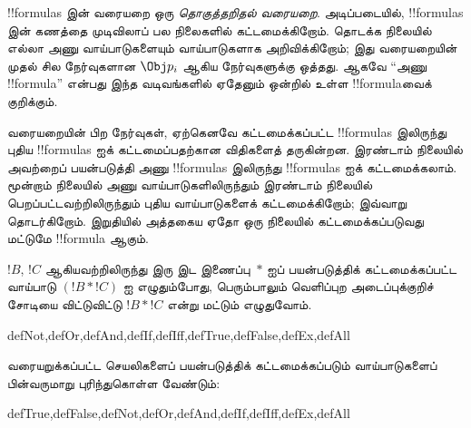 \documentclass[../../../include/open-logic-section]{subfiles}
\begin{document}
\begin{explain}
!!{formula}s இன் வரையறை ஒரு \emph{தொகுத்தறிதல் வரையறை}. அடிப்படையில்,
!!{formula}s இன் கணத்தை முடிவிலாப் பல நிலைகளில் கட்டமைக்கிறோம். தொடக்க
நிலையில் எல்லா அணு வாய்பாடுகளையும் வாய்பாடுகளாக அறிவிக்கிறோம்; இது
வரையறையின் முதல் சில நேர்வுகளான
%
%
$\Obj p_i$ ஆகிய நேர்வுகளுக்கு ஒத்தது. ஆகவே ``அணு !!{formula}'' என்பது
இந்த வடிவங்களில் ஏதேனும் ஒன்றில் உள்ள !!{formula}வைக் குறிக்கும்.

வரையறையின் பிற நேர்வுகள், ஏற்கெனவே கட்டமைக்கப்பட்ட !!{formula}s
இலிருந்து புதிய !!{formula}s ஐக் கட்டமைப்பதற்கான விதிகளைத் தருகின்றன.
இரண்டாம் நிலையில் அவற்றைப் பயன்படுத்தி அணு !!{formula}s இலிருந்து
!!{formula}s ஐக் கட்டமைக்கலாம். மூன்றாம் நிலையில் அணு வாய்பாடுகளிலிருந்தும்
இரண்டாம் நிலையில் பெறப்பட்டவற்றிலிருந்தும் புதிய வாய்பாடுகளைக்
கட்டமைக்கிறோம்; இவ்வாறு தொடர்கிறோம். இறுதியில் அத்தகைய ஏதோ ஒரு நிலையில்
கட்டமைக்கப்படுவது மட்டுமே !!{formula} ஆகும்.
\end{explain}

$!B$, $!C$ ஆகியவற்றிலிருந்து இரு இட இணைப்பு~$\ast$ ஐப் பயன்படுத்திக்
கட்டமைக்கப்பட்ட வாய்பாடு $(!B \ast !C)$ ஐ எழுதும்போது, பெரும்பாலும்
வெளிப்புற அடைப்புக்குறிச் சோடியை விட்டுவிட்டு $!B \ast !C$ என்று மட்டும்
எழுதுவோம்.

\begin{tagblock}{defNot,defOr,defAnd,defIf,defIff,defTrue,defFalse,defEx,defAll}
\begin{defn}
வரையறுக்கப்பட்ட செயலிகளைப் பயன்படுத்திக் கட்டமைக்கப்படும் வாய்பாடுகளைப்
பின்வருமாறு புரிந்துகொள்ள வேண்டும்:

\begin{tagenumerate}{defTrue,defFalse,defNot,defOr,defAnd,defIf,defIff,defEx,defAll}







\end{tagenumerate}
\end{defn}
\end{tagblock}
\end{document}
